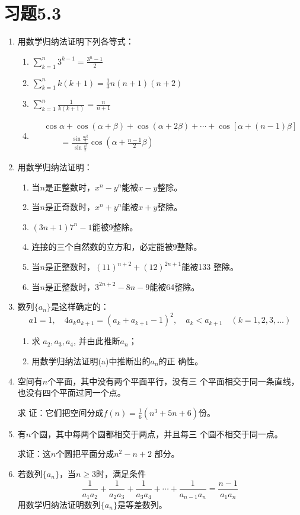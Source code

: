 \section*{习题5.3}
\begin{enumerate}
    \item 用数学归纳法证明下列各等式：
\begin{enumerate}
    \item $\displaystyle\sum^n_{k=1}3^{k-1}=\frac{3^n-1}{2}$
    \item $\displaystyle\sum^n_{k=1}k(k+1)=\frac{1}{3}n(n+1)(n+2)$
    \item $\displaystyle\sum^n_{k=1}\frac{1}{k(k+1)}=\frac{n}{n+1}$
    \item \[ \begin{split}
      & \cos\alpha+\cos(\alpha+\beta)+\cos(\alpha+2\beta)+\cdots+\cos[\alpha+(n-1)\beta]\\
      &\qquad =\frac{\sin\frac{n\beta}{2}}{\sin\frac{\beta}{2}}\cos\left(\alpha+\frac{n-1}{2}\beta\right)
    \end{split}\]
\end{enumerate}

\item 用数学归纳法证明：
\begin{enumerate}
\item 当$n$是正整数时，$x^n-y^n$能被$x-y$整除。
\item 当$n$是正奇数时，$x^n+y^n$能被$x+y$整除。
\item $(3n+1)7^n-1$能被9整除。
\item 连接的三个自然数的立方和，必定能被9整除。
\item 当$n$是正整数时，$(11)^{n+2}+(12)^{2n+1}$能被133
整除。
\item 当$n$是正整数时，$3^{2n+2}-8n-9$能被64整除。
\end{enumerate}

\item 数列$\{a_n\}$是这样确定的：
\[a1=1,\quad 4a_ka_{k+1}=(a_k+a_{k+1}-1)^2,\quad a_k<a_{k+1}\quad (k=1,2,3,\ldots)\]
\begin{enumerate}
    \item 求 $a_2,a_3,a_4$, 并由此推断$a_n$；
    \item 用数学归纳法证明(a)中推断出的$a_n$的正
确性。
\end{enumerate}

\item 空间有$n$个平面，其中没有两个平面平行，没有三
个平面相交于同一条直线，也没有四个平面过同一个点。

求
证：它们把空间分成$f(n)=\frac{1}{6}
(n^3+5n+6)$份。
\item 有$n$个圆，其中每两个圆都相交于两点，并且每三
个圆不相交于同一点。

求证：这$n$个圆把平面分成$n^2-n+2$
部分。

\item 若数列$\{a_n\}$，当$n\ge 3$时，满足条件
\[\frac{1}{a_1a_2}+\frac{1}{a_2a_3}+\frac{1}{a_3a_4}+\cdots+\frac{1}{a_{n-1}a_n}=\frac{n-1}{a_1a_n}\]
用数学归纳法证明数列$\{a_n\}$是等差数列。
\end{enumerate}
